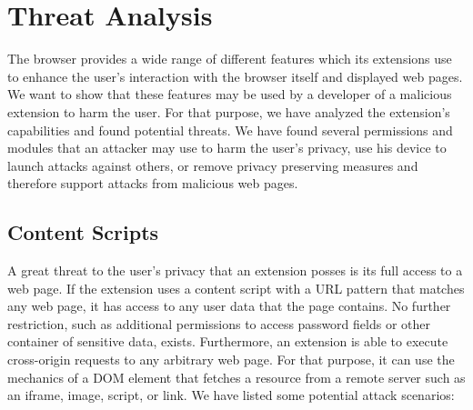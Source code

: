 
\chapter{Threat Analysis}
\label{chp:threatAnalysis}

	The browser provides a wide range of different features which its extensions use to enhance the user's interaction with the browser itself and displayed web pages. We want to show that these features may be used by a developer of a malicious extension to harm the user. For that purpose, we have analyzed the extension's capabilities and found potential threats. We have found several permissions and modules that an attacker may use to harm the user's privacy, use his device to launch attacks against others, or remove privacy preserving measures and therefore support attacks from malicious web pages. 

\section{Content Scripts}
\label{sec:threatAnalysis:contentScripts}

	A great threat to the user's privacy that an extension posses is its full access to a web page. If the extension uses a content script with a URL pattern that matches any web page, it has access to any user data that the page contains. No further restriction, such as additional permissions to access password fields or other container of sensitive data, exists. Furthermore, an extension is able to execute cross-origin requests to any arbitrary web page. For that purpose, it can use the mechanics of a DOM element that fetches a resource from a remote server such as an iframe, image, script, or link. We have listed some potential attack scenarios:
	
